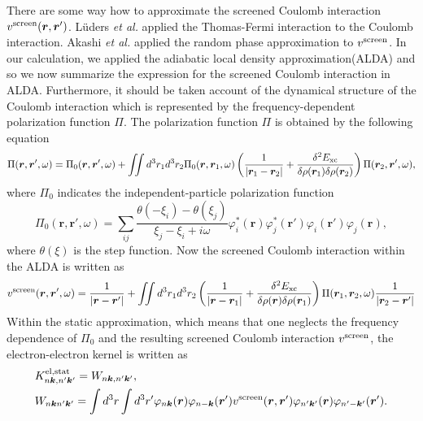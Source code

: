 There are some way how to approximate the screened Coulomb interaction $v^{\rm screen}(\bm r, \bm r')$. 
L\"{u}ders {\it et al.} applied the Thomas-Fermi interaction to the Coulomb interaction\cite{Luders2005_1}.
Akashi {\it et al.}\cite{RA2012} applied the random phase approximation to $v^{\rm screen}$.
In our calculation, we applied the adiabatic local density approximation(ALDA)\cite{Zangwill1980} and 
so we now summarize the expression for the screened Coulomb interaction in ALDA.
Furthermore, it should be taken account of the dynamical structure of the Coulomb interaction which is represented by
the frequency-dependent polarization function $\Pi$.
The polarization function $\Pi$ is obtained by the following equation
%
\begin{equation}
	\Pi(\bm r, \bm r', \omega) = \Pi_0(\bm r, \bm r', \omega) + 
	\iint d^3r_1d^3r_2\Pi_0(\bm r, \bm r_1, \omega) 
	\left(
	\frac{1}{|\bm r_1 - \bm r_2|} + \frac{\delta^2E_{\rm xc}}{\delta\rho(\bm r_1)\delta\rho(\bm r_2)}
	\right)
	\Pi(\bm r_2, \bm r', \omega), 
	\label{eq:Pieq}
\end{equation}
%
where $\Pi_0$ indicates the independent-particle polarization function
%
\begin{equation}
	\Pi_0(\bm r, \bm r', \omega) = \sum_{ij}
	\frac{\theta(-\xi_i)-\theta(\xi_j)}{\xi_j-\xi_i+i\omega}
	\varphi^\ast_i(\bm r)\varphi^\ast_j(\bm r')\varphi_i(\bm r')\varphi_j(\bm r),
	\label{eq:chi0}
\end{equation}
%
where $\theta(\xi)$ is the step function.
Now the screened Coulomb interaction within the ALDA is written as
%
\begin{equation}
	v^{\rm screen}(\bm r, \bm r', \omega) = \frac{1}{|\bm r - \bm r'|} + 
	\iint d^3r_1 d^3r_2 
	\left(
	\frac{1}{|\bm r - \bm r_1|} + \frac{\delta^2E_{\rm xc}}{\delta\rho(\bm r)\delta\rho(\bm r_1)}
	\right)
	\Pi(\bm r_1, \bm r_2, \omega) \frac{1}{|\bm r_2 - \bm r'|}
	\label{eq:vscr}
\end{equation}
%
Within the static approximation, which means that one neglects the frequency dependence of $\Pi_0$ 
and the resulting screened Coulomb interaction $v^{\rm screen}$, the electron-electron kernel
is written as 
%
\begin{equation}
	\begin{split}
	& K^{\rm el, stat}_{n\bm k,n' \bm k'} = W_{n \bm k, n' \bm k'}, \\
	& W_{n\bm kn'\bm k'} = 
	\int d^3r \int d^3r' \varphi_{n\bm k}(\bm r)\varphi_{n-\bm k}({\bm r'})
	v^{\rm screen}(\bm r, {\bm r'}) \varphi_{n'\bm k'}(\bm r) \varphi_{n'-\bm k'}({\bm r'}).
	\label{eq:Kelstat}
\end{split}
\end{equation}
